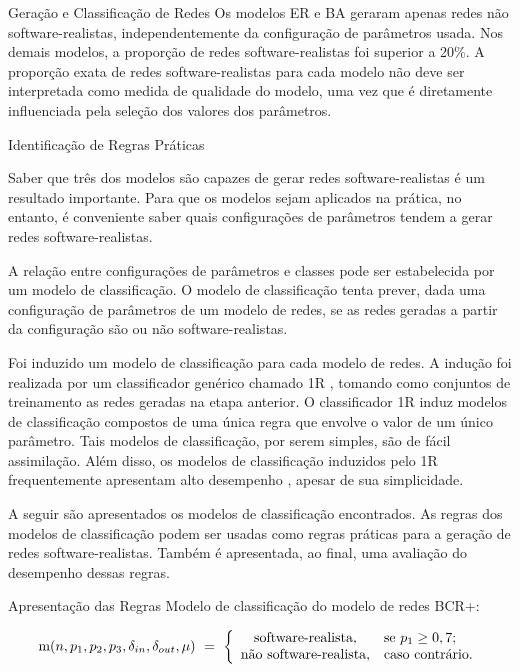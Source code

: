 \begin{section}{Geração e Classificação de Redes}
	Os modelos ER e BA geraram apenas redes não software-realistas, independentemente da configuração de parâmetros usada. Nos demais modelos, a proporção de redes software-realistas foi superior a 20\%. A proporção exata de redes software-realistas para cada modelo não deve ser interpretada como medida de qualidade do modelo, uma vez que é diretamente influenciada pela seleção dos valores dos parâmetros.

\end{section}

\begin{section}{Identificação de Regras Práticas}
	
	Saber que três dos modelos são capazes de gerar redes software-realistas é um resultado importante. Para que os modelos sejam aplicados na prática, no entanto, é conveniente saber quais configurações de parâmetros tendem a gerar redes software-realistas.
	
	A relação entre configurações de parâmetros e classes pode ser estabelecida por um modelo de classificação. O modelo de classificação tenta prever, dada uma configuração de parâmetros de um modelo de redes, se as redes geradas a partir da configuração são ou não software-realistas.
	
	Foi induzido um modelo de classificação para cada modelo de redes. A indução foi realizada por um classificador genérico chamado 1R \cite{OneR}, tomando como conjuntos de treinamento as redes geradas na etapa anterior. O classificador 1R induz modelos de classificação compostos de uma única regra que envolve o valor de um único parâmetro. Tais modelos de classificação, por serem simples, são de fácil assimilação. Além disso, os modelos de classificação induzidos pelo 1R frequentemente apresentam alto desempenho \cite{OneR}, apesar de sua simplicidade.
	
	A seguir são apresentados os modelos de classificação encontrados. As regras dos modelos de classificação podem ser usadas como regras práticas para a geração de redes software-realistas. Também é apresentada, ao final, uma avaliação do desempenho dessas regras.
	
\begin{subsection}{Apresentação das Regras}
	Modelo de classificação do modelo de redes BCR+:
		
	$$
	\mathrm{m}(n, p_1, p_2, p_3, \delta_{in}, \delta_{out}, \mu) ~=~
	\left\{
	\begin{array}{cl}
	\mbox{software-realista,} & \mbox{se } p_1 \ge 0,7; \\
	\mbox{não software-realista,} & \mbox{caso contrário.}
	\end{array}
	\right.
	$$
	

\end{subsection}
\end{section}
